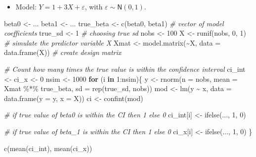 \documentclass[
]{article}
\newenvironment{Shaded}{\begin{snugshade}}{\end{snugshade}}
\newcommand{\AttributeTok}[1]{\textcolor[rgb]{0.77,0.63,0.00}{#1}}
\newcommand{\CommentTok}[1]{\textcolor[rgb]{0.56,0.35,0.01}{\textit{#1}}}
\newcommand{\ControlFlowTok}[1]{\textcolor[rgb]{0.13,0.29,0.53}{\textbf{#1}}}
\newcommand{\DecValTok}[1]{\textcolor[rgb]{0.00,0.00,0.81}{#1}}
\newcommand{\FunctionTok}[1]{\textcolor[rgb]{0.00,0.00,0.00}{#1}}
\newcommand{\NormalTok}[1]{#1}
\newcommand{\OtherTok}[1]{\textcolor[rgb]{0.56,0.35,0.01}{#1}}
\newcommand{\SpecialCharTok}[1]{\textcolor[rgb]{0.00,0.00,0.00}{#1}}
\providecommand{\tightlist}{%
  \setlength{\itemsep}{0pt}\setlength{\parskip}{0pt}}
\begin{document}
\begin{itemize}
\tightlist
\item
  Model: \(Y = 1 + 3X + \varepsilon\), with
  \(\varepsilon \sim \mathsf{N}(0,1)\).
\end{itemize}

\begin{Shaded}
\begin{Highlighting}[]
\NormalTok{beta0 }\OtherTok{\textless{}{-}}\NormalTok{ ...}
\NormalTok{beta1 }\OtherTok{\textless{}{-}}\NormalTok{ ...}
\NormalTok{true\_beta }\OtherTok{\textless{}{-}} \FunctionTok{c}\NormalTok{(beta0, beta1) }\CommentTok{\# vector of model coefficients}
\NormalTok{true\_sd }\OtherTok{\textless{}{-}} \DecValTok{1} \CommentTok{\# choosing true sd}
\NormalTok{nobs }\OtherTok{\textless{}{-}} \DecValTok{100}
\NormalTok{X }\OtherTok{\textless{}{-}} \FunctionTok{runif}\NormalTok{(nobs, }\DecValTok{0}\NormalTok{, }\DecValTok{1}\NormalTok{) }\CommentTok{\# simulate the predictor variable X}
\NormalTok{Xmat }\OtherTok{\textless{}{-}} \FunctionTok{model.matrix}\NormalTok{(}\SpecialCharTok{\textasciitilde{}}\NormalTok{X, }\AttributeTok{data =} \FunctionTok{data.frame}\NormalTok{(X)) }\CommentTok{\# create design matrix}

\CommentTok{\# Count how many times the true value is within the confidence interval}
\NormalTok{ci\_int }\OtherTok{\textless{}{-}}\NormalTok{ ci\_x }\OtherTok{\textless{}{-}} \DecValTok{0}
\NormalTok{nsim }\OtherTok{\textless{}{-}} \DecValTok{1000}
\ControlFlowTok{for}\NormalTok{ (i }\ControlFlowTok{in} \DecValTok{1}\SpecialCharTok{:}\NormalTok{nsim)\{}
\NormalTok{  y }\OtherTok{\textless{}{-}} \FunctionTok{rnorm}\NormalTok{(}\AttributeTok{n =}\NormalTok{ nobs, }\AttributeTok{mean =}\NormalTok{ Xmat }\SpecialCharTok{\%*\%}\NormalTok{ true\_beta, }\AttributeTok{sd =} \FunctionTok{rep}\NormalTok{(true\_sd, nobs))}
\NormalTok{  mod }\OtherTok{\textless{}{-}} \FunctionTok{lm}\NormalTok{(y }\SpecialCharTok{\textasciitilde{}}\NormalTok{ x, }\AttributeTok{data =} \FunctionTok{data.frame}\NormalTok{(}\AttributeTok{y =}\NormalTok{ y, }\AttributeTok{x =}\NormalTok{ X))}
\NormalTok{  ci }\OtherTok{\textless{}{-}} \FunctionTok{confint}\NormalTok{(mod)}

  \CommentTok{\# if true value of beta0 is within the CI then 1 else 0}
\NormalTok{  ci\_int[i] }\OtherTok{\textless{}{-}} \FunctionTok{ifelse}\NormalTok{(..., }\DecValTok{1}\NormalTok{, }\DecValTok{0}\NormalTok{)}

  \CommentTok{\# if true value of beta\_1 is within the CI then 1 else 0}
\NormalTok{  ci\_x[i] }\OtherTok{\textless{}{-}} \FunctionTok{ifelse}\NormalTok{(..., }\DecValTok{1}\NormalTok{, }\DecValTok{0}\NormalTok{)}
\NormalTok{\}}

\FunctionTok{c}\NormalTok{(}\FunctionTok{mean}\NormalTok{(ci\_int), }\FunctionTok{mean}\NormalTok{(ci\_x))}
\end{Highlighting}
\end{Shaded}
\end{document}
